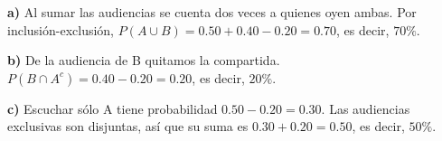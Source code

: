\textbf{a)} Al sumar las audiencias se cuenta dos veces a quienes
oyen ambas. Por inclusión-exclusión,
$P(A\cup B)=0.50+0.40-0.20=0.70$, es decir, $\boxed{70\%}$.

\textbf{b)} De la audiencia de B quitamos la compartida.
$P(B\cap A^c)=0.40-0.20=0.20$, es decir, $\boxed{20\%}$.

\textbf{c)} Escuchar sólo A tiene probabilidad $0.50-0.20=0.30$.
Las audiencias exclusivas son disjuntas, así que su suma es
$0.30+0.20=0.50$, es decir, $\boxed{50\%}$.
